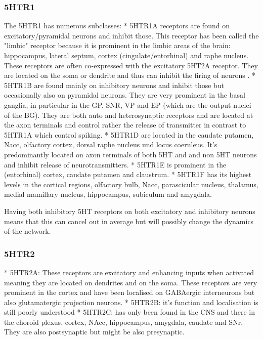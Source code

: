 \documentclass[12pt,a4paper]{article}
\begin{document}
\subsubsection{5HTR1}

The 5HTR1 has numerous subclasses:
  * 5HTR1A receptors are found on excitatory/pyramidal neurons and inhibit those. This receptor has been called the "limbic" receptor because it is prominent in the limbic areas of the brain: hippocampus, lateral septum, cortex (cingulate/entorhinal) and raphe nucleus. These receptors are often co-expressed with the excitatory 5HT2A receptor. They are located on the soma or dendrite and thus can inhibit the firing of neurons \citep{Riad2000}.
  * 5HTR1B are found mainly on inhibitory neurons and inhibit those but occasionally also on pyramidal neurons. They are very prominent in the basal ganglia, in particular in the GP, SNR, VP and EP (which are the output nuclei of the BG). They are both auto and heterosynaptic receptors and are located at the axon terminals \citep{Riad2000} and control rather the release of transmitter in contrast to 5HTR1A which control spiking.
  * 5HTR1D are located in the caudate putamen, Nacc, olfactory cortex, dorsal raphe nucleus und locus coeruleus. It's predominantly located on axon terminals of both 5HT and and non 5HT neurons and inhibit release of neurotransmitters.
  * 5HTR1E is prominent in the (entorhinal) cortex, caudate putamen and claustrum.
  * 5HTR1F has its highest levels in the cortical regions, olfactory bulb, Nacc, parascicular nucleus, thalamus, medial mamillary nucleus, hippocampus, subiculum and amygdala.

Having both inhibitory 5HT receptors on both excitatory and inhibitory neurons means that this can cancel out in average but will possibly change the dynamics of the network.

\subsubsection{5HTR2}

  * 5HTR2A: These receptors are excitatory and enhancing inputs when activated meaning they are located on dendrites and on the soma. These receptors are very prominent in the cortex and have been localised on GABAergic interneurons but also glutamatergic projection neurons.
  * 5HTR2B: it's function and localisation is still poorly understood
  * 5HTR2C: has only been found in the CNS and there in the choroid plexus, cortex, NAcc, hippocampus, amygdala, caudate and SNr. They are also postsynaptic but might be also presynaptic.
\end{document}
